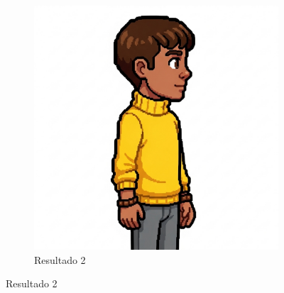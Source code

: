 \begin{figure}[htbp]
\begin{subfigure}{0.3\linewidth}
        \includegraphics[width=1\linewidth]{figs/geminiPro/chat4/res1_tela6.PNG}
        \caption{\small Resultado 2}
        \label{fig:geminiPro10b}
    \end{subfigure}
\end{figure}

